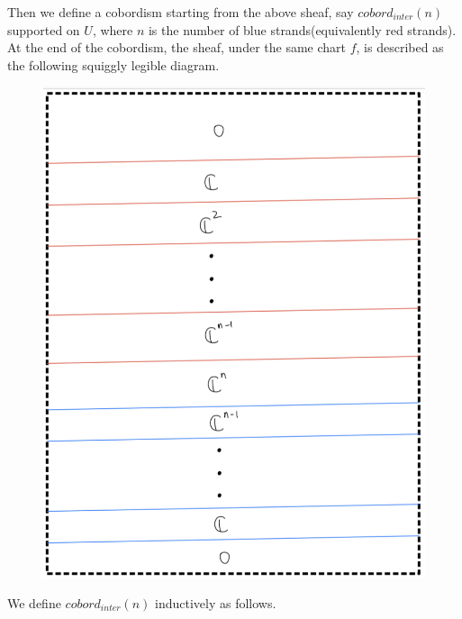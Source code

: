 Then we define a cobordism starting from the above sheaf, say $cobord_{inter}(n)$ supported on $U$, where $n$ is the number of blue strands(equivalently red strands). At the end of the cobordism, the sheaf, under the same chart $f$, is described as the following squiggly legible diagram. 
\begin{figure}[H]
    \centering
    \includegraphics[scale = 0.95]{diagrams/cobord_inter/7.png}
    \caption{}
    \label{fig:your-label}
\end{figure} 
We define $cobord_{inter}(n)$ inductively as follows.
